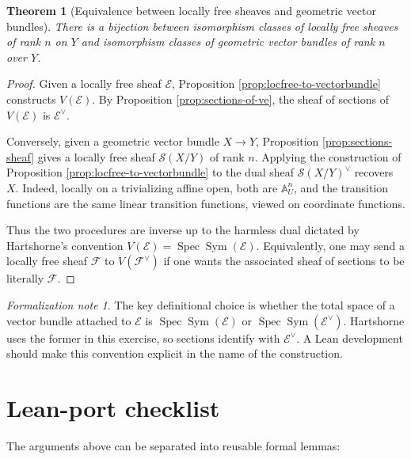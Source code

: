 \documentclass[11pt]{amsart}
\DeclareMathOperator{\Spec}{Spec}
\DeclareMathOperator{\Sym}{Sym}
\newcommand{\F}{\mathscr F}
\newcommand{\E}{\mathscr E}
\theoremstyle{plain}
\newtheorem{theorem}{Theorem}[section]
\theoremstyle{definition}
\theoremstyle{remark}
\newtheorem*{formalization}{Formalization note}
\begin{document}
\begin{theorem}[Equivalence between locally free sheaves and geometric vector bundles]\label{thm:vectorbundle-correspondence}
There is a bijection between isomorphism classes of locally free sheaves of rank $n$ on $Y$ and isomorphism classes of geometric vector bundles of rank $n$ over $Y$.
\end{theorem}

\begin{proof}
Given a locally free sheaf $\E$, Proposition \ref{prop:locfree-to-vectorbundle} constructs $V(\E)$.  By Proposition \ref{prop:sections-of-ve}, the sheaf of sections of $V(\E)$ is $\E^\vee$.

Conversely, given a geometric vector bundle $X\to Y$, Proposition \ref{prop:sections-sheaf} gives a locally free sheaf $\mathscr S(X/Y)$ of rank $n$.  Applying the construction of Proposition \ref{prop:locfree-to-vectorbundle} to the dual sheaf $\mathscr S(X/Y)^\vee$ recovers $X$.  Indeed, locally on a trivializing affine open, both are $\mathbb A^n_U$, and the transition functions are the same linear transition functions, viewed on coordinate functions.

Thus the two procedures are inverse up to the harmless dual dictated by Hartshorne's convention $V(\E)=\Spec\Sym(\E)$.  Equivalently, one may send a locally free sheaf $\F$ to $V(\F^\vee)$ if one wants the associated sheaf of sections to be literally $\F$.
\end{proof}

\begin{formalization}
The key definitional choice is whether the total space of a vector bundle attached to $\E$ is $\Spec\Sym(\E)$ or $\Spec\Sym(\E^\vee)$.  Hartshorne uses the former in this exercise, so sections identify with $\E^\vee$.  A Lean development should make this convention explicit in the name of the construction.
\end{formalization}

\section*{Lean-port checklist}
The arguments above can be separated into reusable formal lemmas:
\end{document}
